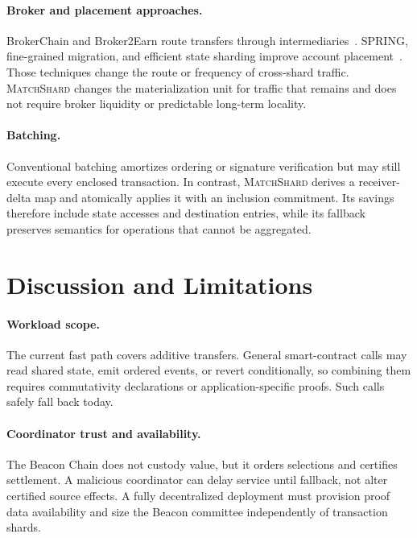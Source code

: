 \documentclass[sigconf,anonymous,review]{acmart}
\newcommand{\system}{\textsc{MatchShard}\xspace}
\begin{document}
\paragraph{Broker and placement approaches.}
BrokerChain and Broker2Earn route transfers through intermediaries~\cite{brokerchain2022,broker2earn2024}. SPRING, fine-grained migration, and efficient state sharding improve account placement~\cite{spring2024,finelock2024,statesharding2024}. Those techniques change the route or frequency of cross-shard traffic. \system changes the materialization unit for traffic that remains and does not require broker liquidity or predictable long-term locality.

\paragraph{Batching.}
Conventional batching amortizes ordering or signature verification but may still execute every enclosed transaction. In contrast, \system derives a receiver-delta map and atomically applies it with an inclusion commitment. Its savings therefore include state accesses and destination entries, while its fallback preserves semantics for operations that cannot be aggregated.

\section{Discussion and Limitations}

\paragraph{Workload scope.}
The current fast path covers additive transfers. General smart-contract calls may read shared state, emit ordered events, or revert conditionally, so combining them requires commutativity declarations or application-specific proofs. Such calls safely fall back today.

\paragraph{Coordinator trust and availability.}
The Beacon Chain does not custody value, but it orders selections and certifies settlement. A malicious coordinator can delay service until fallback, not alter certified source effects. A fully decentralized deployment must provision proof data availability and size the Beacon committee independently of transaction shards.
\end{document}
